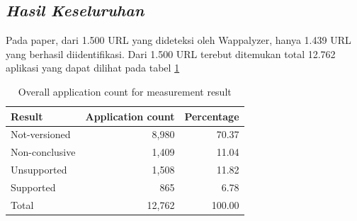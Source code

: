 \subsection{\textit{Hasil Keseluruhan}}
Pada paper\cite{pascal}, dari 1.500 URL yang dideteksi oleh Wappalyzer, hanya 1.439 URL yang berhasil diidentifikasi. Dari 1.500 URL terebut ditemukan total 12.762 aplikasi yang dapat dilihat pada tabel \ref{table:apr}
\begin{table}[h!]
	\centering
	\begin{tabular}{lrr} 
		\hline
		\textbf{Result} & \textbf{Application count} & \textbf{Percentage}\\
		\hline
		Not-versioned & 8,980 & 70.37\\
		Non-conclusive & 1,409 & 11.04\\
		Unsupported & 1,508 & 11.82\\
		Supported & 865 & 6.78\\
		\hline
		Total & 12,762 & 100.00\\
		\hline
		
	\end{tabular}
	\caption{Overall application count for measurement result}
	\label{table:apr}
\end{table}











